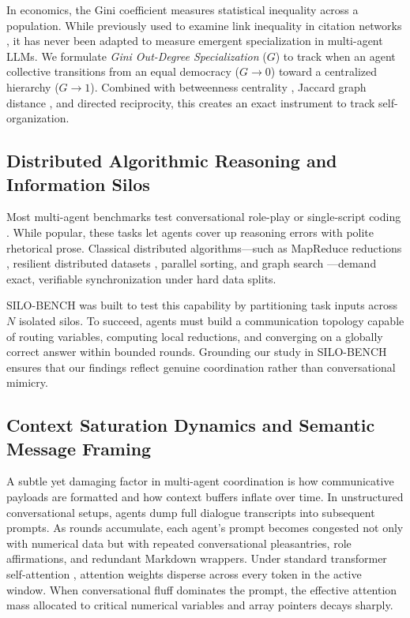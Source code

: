 \documentclass{ieeeaccess}
\begin{document}
In economics, the Gini coefficient \cite{gini1912variabilita} measures statistical inequality across a population. While previously used to examine link inequality in citation networks \cite{page1999pagerank}, it has never been adapted to measure emergent specialization in multi-agent LLMs. We formulate \textit{Gini Out-Degree Specialization} ($G$) to track when an agent collective transitions from an equal democracy ($G \to 0$) toward a centralized hierarchy ($G \to 1$). Combined with betweenness centrality \cite{freeman1977set}, Jaccard graph distance \cite{jaccard1912distribution}, and directed reciprocity, this creates an exact instrument to track self-organization.

\subsection{Distributed Algorithmic Reasoning and Information Silos}
Most multi-agent benchmarks test conversational role-play or single-script coding \cite{du2023debate, qian2024chatdev, hong2024metagpt}. While popular, these tasks let agents cover up reasoning errors with polite rhetorical prose. Classical distributed algorithms---such as MapReduce reductions \cite{dean2008mapreduce}, resilient distributed datasets \cite{zaharia2012resilient}, parallel sorting, and graph search \cite{lynch1996distributed}---demand exact, verifiable synchronization under hard data splits.

SILO-BENCH \cite{john2026silobench} was built to test this capability by partitioning task inputs across $N$ isolated silos. To succeed, agents must build a communication topology capable of routing variables, computing local reductions, and converging on a globally correct answer within bounded rounds. Grounding our study in SILO-BENCH ensures that our findings reflect genuine coordination rather than conversational mimicry.

\subsection{Context Saturation Dynamics and Semantic Message Framing}
A subtle yet damaging factor in multi-agent coordination is how communicative payloads are formatted and how context buffers inflate over time. In unstructured conversational setups, agents dump full dialogue transcripts into subsequent prompts. As rounds accumulate, each agent's prompt becomes congested not only with numerical data but with repeated conversational pleasantries, role affirmations, and redundant Markdown wrappers. Under standard transformer self-attention \cite{vaswani2017attention}, attention weights disperse across every token in the active window. When conversational fluff dominates the prompt, the effective attention mass allocated to critical numerical variables and array pointers decays sharply.
\end{document}
